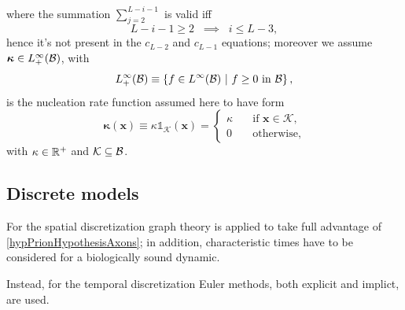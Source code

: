 \documentclass{article}
\begin{document}
                where the summation $\sum_{j=2}^{L-i-1}$ is valid iff
                \[
                L-i-1\ge2\;\;\implies\;\;i\le L-3,
                \]
                hence it's not present in the $c_{L-2}$ and $c_{L-1}$ equations; more\-over we assume $\boldsymbol\kappa\in L_+^\infty(\mathcal B)$, with
                \begin{equation*}
                    L_+^\infty(\mathcal B)\equiv
                    \left\{f\in L^\infty(\mathcal B)
                    \ \vert\ f\ge0\text{ in }\mathcal B\right\},
                \end{equation*}
                is the nucleation rate function\footnotemark{} assumed here to have form
                \begin{equation}
                    \boldsymbol\kappa(\mathbf x)\equiv
                    \kappa\mathbb1_{\mathcal K}(\mathbf x)=
                    \left\{
                    \begin{aligned}
                        \kappa&\quad\text{if }\mathbf x\in\mathcal K,\\
                        0&\quad\text{otherwise},
                    \end{aligned}
                    \right.
                    \label{eqNucleationIndicatorFunction}
                \end{equation}
                with $\kappa\in\mathbb R^+$ and $\mathcal K\subseteq\mathcal B$.


        \subsection{Discrete models}\label{secDiscreteModels}

            For the spatial discretization graph theory is applied to take full advantage of \ref{hypPrionHypothesisAxons}; in addition, characteristic times have to be considered for a biologically sound dynamic.
            
            Instead, for the temporal discretization Euler methods, both explicit and implict, are used.
\end{document}
